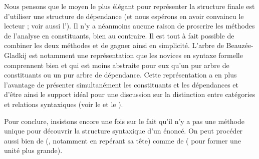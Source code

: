 Nous pensons que le moyen le plus élégant pour représenter la structure finale est d’utiliser une structure de dépendance (et nous espérons en avoir convaincu le lecteur ; voir aussi l’). Il n’y a néanmoins aucune raison de proscrire les méthodes de l’analyse en constituants, bien au contraire. Il est tout à fait possible de combiner les deux méthodes et de gagner ainsi en simplicité. L’arbre de Beauzée-Gladkij est notamment une représentation que les novices en syntaxe formelle comprennent bien et qui est moins abstraite pour eux qu’un pur arbre de constituants ou un pur arbre de dépendance. Cette représentation a en plus l’avantage de présenter simultanément les constituants et les dépendances et d’être ainsi le support idéal pour une discussion sur la distinction entre catégories et relations syntaxiques (voir le  et le ).

Pour conclure, insistons encore une fois sur le fait qu’il n’y a pas une méthode unique pour découvrir la structure syntaxique d’un énoncé. On peut procéder aussi bien de  (, notamment en repérant sa tête) comme de  ( pour former une unité plus grande).

